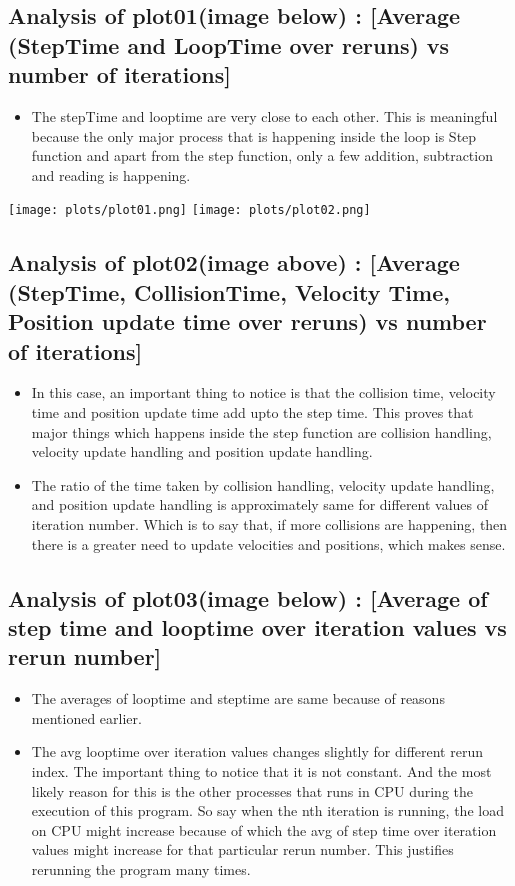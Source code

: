 \documentclass[english]{article}
\begin{document}
\subsection{Analysis of plot01(image below) : [Average (StepTime and LoopTime over reruns) vs number of iterations]}
\begin{itemize}
\item The stepTime and looptime are very close to each other. This is meaningful because the only major process that is happening inside the loop is Step function and apart from the step function, only a few addition, subtraction and reading is happening.
\end{itemize}

\texttt{[image: plots/plot01.png]}
\texttt{[image: plots/plot02.png]}

\subsection{Analysis of plot02(image above) : [Average (StepTime, CollisionTime, Velocity Time, Position update time over reruns) vs number of iterations]}
\begin{itemize}
\item In this case, an important thing to notice is that the collision time, velocity time and position update time add upto the step time. This proves that major things which happens inside the step function are collision handling, velocity update handling and position update handling.
\item The ratio of the time taken by collision handling, velocity update handling, and position update handling is approximately same for different values of iteration number. Which is to say that, if more collisions are happening, then there is a greater need to update velocities and positions, which makes sense.
\end{itemize}

\subsection{Analysis of plot03(image below) : [Average of step time and looptime over iteration values vs rerun number]}
\begin{itemize}
\item The averages of looptime and steptime are same because of reasons mentioned earlier.
\item The avg looptime over iteration values changes slightly for different rerun index. The important thing to notice that it is not constant. And the most likely reason for this is the other processes that runs in CPU during the execution of this program. So say when the nth iteration is running, the load on CPU might increase because of which the avg of step time over iteration values might increase for that particular rerun number. This justifies rerunning the program many times.
\end{itemize}
\end{document}
